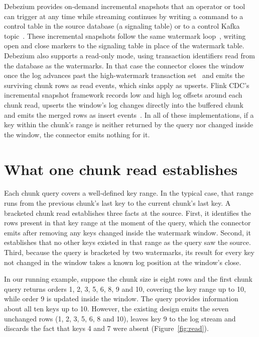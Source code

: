 \documentclass[sigconf,nonacm,10pt]{acmart}
\begin{document}
Debezium provides on-demand
incremental snapshots that an operator or tool can trigger at any time while
streaming continues by writing a command to a control table in the source
database (a signaling table) or to a control Kafka
topic~\cite{debezium_incremental_snapshots,debezium_signalling}. These
incremental snapshots follow the same watermark
loop~\cite{debezium_incremental_snapshots,debezium_mysql_connector}, writing
open and close markers to the signaling table in place of the watermark table.
Debezium also supports a read-only mode, using transaction identifiers read from the
database as the watermarks. In that case the connector closes the window once the log advances past the
high-watermark transaction set~\cite{debezium_readonly_blog,debezium_postgresql_connector}
and emits the surviving chunk rows as read events, which sinks apply as upserts. Flink CDC's incremental
snapshot framework records low and high log offsets around each chunk read,
upserts the window's log changes directly into the buffered chunk and emits the
merged rows as insert events~\cite{flinkcdc_mysql}. In all of these
implementations, if a key within the chunk's range is neither returned by the
query nor changed inside the window, the connector emits nothing for it.

\section{What one chunk read establishes}\label{sec:gap}

Each chunk query covers a well-defined key range. In the typical case, that
range runs from the previous chunk's last key to the current chunk's last key. 
A bracketed chunk read establishes three facts at the source. First, it identifies the rows present in
that key range at the moment of the query, which the connector emits after
removing any keys changed inside the watermark window. Second, it establishes 
that no other keys existed in that range as the query saw the source. Third, because
the query is bracketed by two watermarks, its result for every key not changed in the window 
takes a known log position at the window's close.

In our running example, suppose the chunk size is eight rows and the first chunk
query returns orders 1, 2, 3, 5, 6, 8, 9 and 10, covering the key range up to
10, while order 9 is updated inside the window. The query provides information
about all ten keys up to 10. However, the existing design emits the seven
unchanged rows (1, 2, 3, 5, 6, 8 and 10), leaves key 9 to the log stream and discards the fact that keys 4 and 7 were absent (Figure~\ref{fig:read}).
\end{document}
